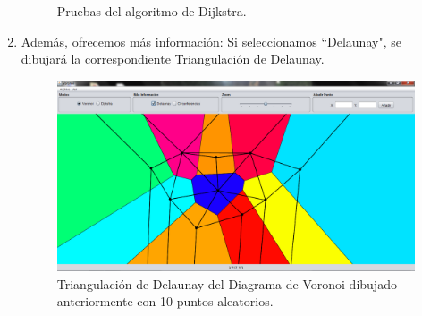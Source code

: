 \begin{enumerate}
\begin{figure}[H]
{            }
            \caption{Pruebas del algoritmo de Dijkstra.} \label{fig:incre}
        \end{figure}        
        \item Además, ofrecemos más información: Si seleccionamos ``Delaunay", se dibujará la correspondiente Triangulación de Delaunay.   
        \begin{figure}  [H]
            \centering
            \includegraphics[scale=0.3]{imagenes/delaunay.png}
            \caption{Triangulación de Delaunay del Diagrama de Voronoi dibujado anteriormente con 10 puntos aleatorios.}
        \end{figure}
        

\end{enumerate}
